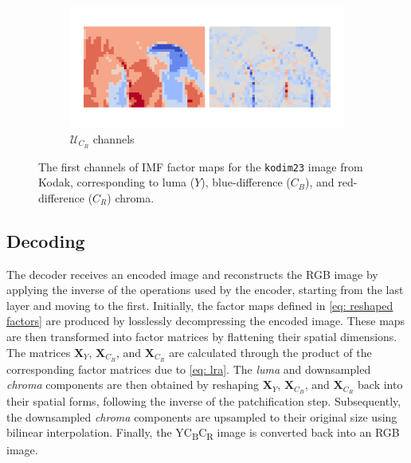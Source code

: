 \begin{figure}[t]
\begin{minipage}{0.35\textwidth}
\begin{minipage}{\textwidth}
        \end{minipage}
        \begin{minipage}{\textwidth}
            \begin{subfigure}{\textwidth}
                \centering
                \includegraphics[width=.95\textwidth]{figures/kodim23_cr_components.pdf}
                \vspace{-15pt}
                \caption{$\bm{\mathcal{U}}_{C_R}$ channels}
            \end{subfigure}%
        \end{minipage}
    \end{minipage}
    \caption{The first channels of IMF factor maps for the \texttt{kodim23} image from Kodak, corresponding to luma ($Y$), blue-difference ($C_B$), and red-difference ($C_R$) chroma.}
	\label{fig:imf_components}
\end{figure}


\subsection{Decoding} \label{sec: decoding}

The decoder receives an encoded image and reconstructs the RGB image by applying the inverse of the operations used by the encoder, starting from the last layer and moving to the first. Initially, the factor maps defined in \eqref{eq: reshaped factors} are produced by losslessly decompressing the encoded image. These maps are then transformed into factor matrices by flattening their spatial dimensions. The matrices $\bm{X}_{Y}$, $\bm{X}_{C_B}$, and $\bm{X}_{C_R}$ are calculated through the product of the corresponding factor matrices due to \eqref{eq: lra}. The \emph{luma} and downsampled \emph{chroma} components are then obtained by reshaping $\bm{X}_{Y}$, $\bm{X}_{C_B}$, and $\bm{X}_{C_R}$ back into their spatial forms, following the inverse of the patchification step. Subsequently, the downsampled \emph{chroma} components are upsampled to their original size using bilinear interpolation. Finally, the YC\textsubscript{B}C\textsubscript{R} image is converted back into an RGB image. 

